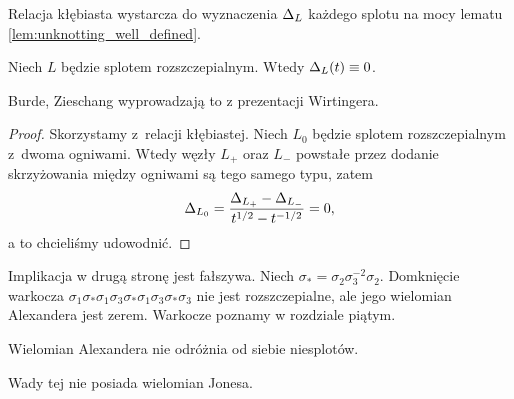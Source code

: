 Relacja kłębiasta wystarcza do wyznaczenia $\Delta_L$ każdego splotu na mocy lematu \ref{lem:unknotting_well_defined}.

\begin{proposition}
%
\label{prp:alexander_unlinks}
    Niech $L$ będzie splotem rozszczepialnym.
    Wtedy $\Delta_L(t) \equiv 0$.
\end{proposition}

Burde, Zieschang \cite[s. 150]{burde2014} wyprowadzają to z prezentacji Wirtingera.

\begin{proof}
    Skorzystamy z~relacji kłębiastej.
    Niech $L_0$ będzie splotem rozszczepialnym z~dwoma ogniwami.
    Wtedy węzły $L_+$ oraz $L_-$ powstałe przez dodanie skrzyżowania między ogniwami są tego samego typu, zatem
    \begin{equation}
        \Delta_{L_0} = \frac{\Delta_{L_+} - \Delta_{L_-}}{t^{1/2} - t^{-1/2}} = 0,
    \end{equation}
    a to chcieliśmy udowodnić.
\end{proof}

Implikacja w drugą stronę jest fałszywa.
Niech $\sigma_* = \sigma_{2} \sigma_{3}^{-2} \sigma_{2}$.
Domknięcie warkocza $\sigma_{1} \sigma_* \sigma_{1} \sigma_{3} \sigma_* \sigma_{1} \sigma_{3} \sigma_* \sigma_{3}$ nie jest rozszczepialne, ale jego wielomian Alexandera jest zerem.
%
Warkocze poznamy w rozdziale piątym.

\begin{corollary}
    Wielomian Alexandera nie odróżnia od siebie niesplotów.
\end{corollary}

Wady tej nie posiada wielomian Jonesa.


